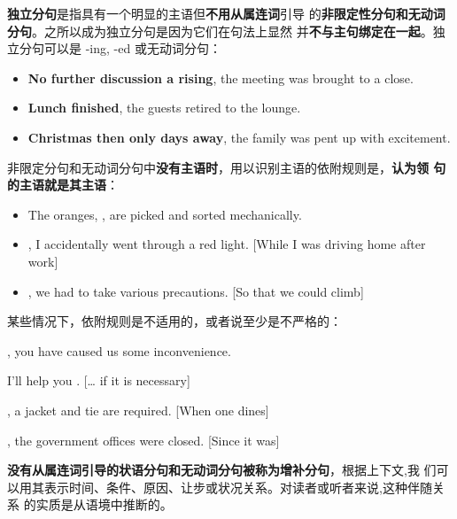 \textbf{独立分句}是指具有一个明显的主语但\textbf{不用从属连词}引导
的\textbf{非限定性分句和无动词分句}。之所以成为独立分句是因为它们在句法上显然
并\textbf{不与主句绑定在一起}。独立分句可以是 -ing, -ed 或无动词分句：
\begin{itemize}
\item \textbf{No further discussion a rising}, the meeting was brought to a close.
\item \textbf{Lunch finished}, the guests retired to the lounge.
\item \textbf{Christmas then only days away}, the family was pent up with excitement.
\end{itemize}

非限定分句和无动词分句中\textbf{没有主语时}，用以识别主语的依附规则是，\textbf{认为领
句的主语就是其主语}：
\begin{itemize}
\item The oranges, , are picked and sorted
  mechanically.

\item {}, I accidentally went through a red
  light. [While I was driving home after work]

\item {}, we had to take various precautions. [So that
  we could climb]

\end{itemize}

某些情况下，依附规则是不适用的，或者说至少是不严格的：
\begin{description}[style=nextline]
\item[分句是一个主语外接状语, 这时隐含的主语是说话者 I]

  , you have caused us some inconvenience.

\item[隐含的主语是整个主句]

  I'll help you . [\ldots{} if it is necessary]

\item[隐含的主语是一个不定代词或支撑词 it]

  , a jacket and tie are required. [When one
  dines]

  , the government offices were closed. [Since it was]
\end{description}


\textbf{没有从属连词引导的状语分句和无动词分句被称为增补分句}，根据上下文,我
们可以用其表示时间、条件、原因、让步或状况关系。对读者或听者来说,这种伴随关系
的实质是从语境中推断的。

